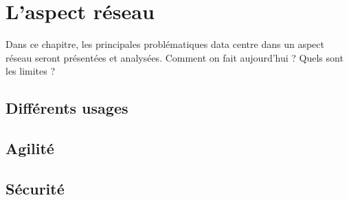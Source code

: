 \chapter{L'aspect réseau}
Dans ce chapitre, les principales problématiques data centre dans un aspect réseau seront présentées et analysées.  Comment on fait aujourd'hui ? Quels sont les limites ? 

\section{Différents usages}

\section{Agilité}

\section{Sécurité}